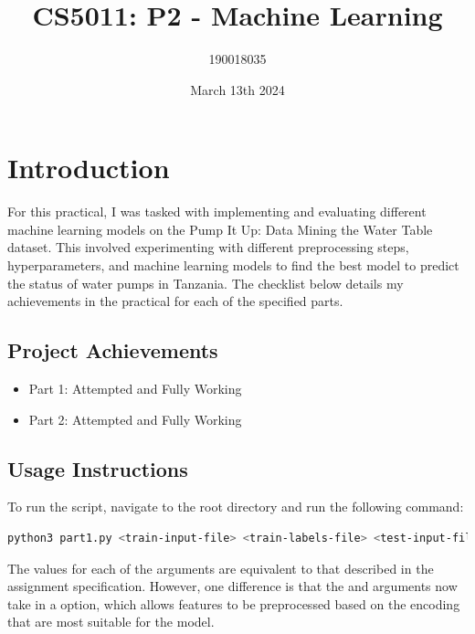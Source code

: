 \documentclass{article}
\title{CS5011: P2 - Machine Learning}
\author{190018035}
\date{March 13th 2024}
\begin{document}
\maketitle

\tableofcontents

\section{Introduction}
For this practical, I was tasked with implementing and evaluating different machine learning models on the Pump It Up: Data Mining the Water Table \cite{DrivenData} dataset. This involved experimenting with different preprocessing steps, hyperparameters, and machine learning models to find the best model to predict the status of water pumps in Tanzania. The checklist below details my achievements in the practical for each of the specified parts.

\subsection{Project Achievements}
\begin{itemize}
    \item{Part 1: Attempted and Fully Working}
    \item{Part 2: Attempted and Fully Working}
\end{itemize}

\subsection{Usage Instructions}

To run the script, navigate to the root directory and run the following command:

\begin{lstlisting}[language=bash]
python3 part1.py <train-input-file> <train-labels-file> <test-input-file> <numerical-preprocessing> <categorical-preprocessing> <model-type> <test-prediction-output-file>
\end{lstlisting}

\noindent The values for each of the arguments are equivalent to that described in the assignment specification. However, one difference is that the  and  arguments now take in a  option, which allows features to be preprocessed based on the encoding that are most suitable for the model. 
\end{document}
